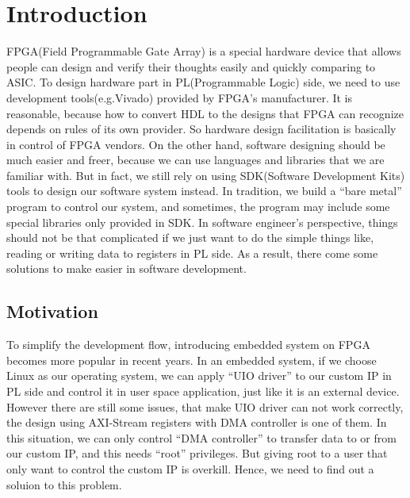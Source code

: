 \chapter{Introduction}
\label{cha:introduction}
FPGA(Field Programmable Gate Array) is a special hardware device that allows people can design and verify their thoughts easily and quickly comparing to ASIC. To design hardware part in PL(Programmable Logic) side, we need to use development tools(e.g.Vivado) provided by FPGA's manufacturer. It is reasonable, because how to convert HDL to the designs that FPGA can recognize depends on rules of its own provider. So hardware design facilitation is basically in control of FPGA vendors. On the other hand, software designing should be much easier and freer, because we can use languages and libraries that we are familiar with. But in fact, we still rely on using SDK(Software Development Kits) tools to design our software system instead. In tradition, we build a ``bare metal'' program to control our system, and sometimes, the program may include some special libraries only provided in SDK. In software engineer's perspective, things should not be that complicated if we just want to do the simple things like, reading or writing data to registers in PL side. As a result, there come some solutions to make easier in software development.  


\section{Motivation}
\label{sec:Motivation}

 To simplify the development flow, introducing embedded system on FPGA becomes more popular in recent years. In an embedded system, if we choose Linux as our operating system, we can apply ``UIO driver'' to our custom IP in PL side and control it in user space application, just like it is an external device. However there are still some issues, that make UIO driver can not work correctly, the design using AXI-Stream registers with DMA controller is one of them. In this situation, we can only control ``DMA controller'' to transfer data to or from our custom IP, and this needs ``root'' privileges. But giving root to a user that only want to control the custom IP is overkill. Hence, we need to find out a soluion to this problem. 

